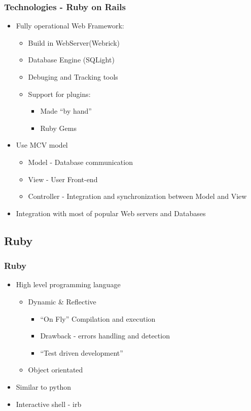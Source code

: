 \documentclass{beamer}
\theoremstyle{mystyle}
\begin{document}
    \begin{frame}
      \frametitle{Technologies - Ruby on Rails}
      \begin{itemize}
        \item Fully operational Web Framework:
          \begin{itemize}
            \item Build in WebServer(Webrick)
            \item Database Engine (SQLight)
            \item Debuging and Tracking tools
            \item Support for plugins:
              \begin{itemize}
                \item Made ``by hand''
                \item Ruby Gems 
              \end{itemize}

          \end{itemize}
        \item Use MCV model
          \begin{itemize}
            \item Model - Database communication
            \item View - User Front-end
            \item Controller - Integration and synchronization between Model and View
          \end{itemize}
        \item Integration with most of popular Web servers and Databases

      \end{itemize}

    \end{frame}

\subsection{Ruby}
\begin{frame}
  \frametitle{Ruby}
  \begin{itemize}
    \item High level programming language
      \begin{itemize}
        \item Dynamic \& Reflective
          \begin{itemize}
            \item ``On Fly'' Compilation and execution
            \item Drawback - errors handling and detection
            \item ``Test driven development''
          \end{itemize}
        \item Object orientated
      \end{itemize}
    \item Similar to python
    \item Interactive shell - irb
\end{itemize}
\end{frame}
\end{document}
